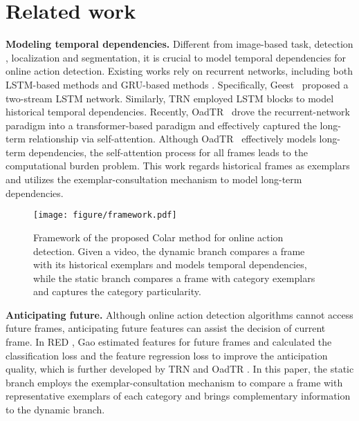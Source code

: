 \documentclass[10pt,twocolumn,letterpaper]{article}
\begin{document}
\section{Related work}

\noindent
\textbf{Modeling temporal dependencies.} Different from image-based task, \eg detection \cite{feng2020progressive, feng2020tcanet, yao2020automatic, feng2021saenet}, localization\cite{zhu2021few, guo2021strengthen, zhang2021weakly} and segmentation\cite{zhangD2021weakly}, it is crucial to model temporal dependencies for online action detection. Existing works rely on recurrent networks, including both LSTM-based methods \cite{de2018modeling, yuan2017temporal, xu2019temporal} and GRU-based methods \cite{eun2020learning}. Specifically, Geest~\etal \cite{de2018modeling} proposed a two-stream LSTM \cite{hochreiter1997long} network. Similarly, TRN \cite{xu2019temporal} employed LSTM blocks to model historical temporal dependencies. Recently, OadTR~\cite{wang2021oadtr} drove the recurrent-network paradigm into a transformer-based paradigm and effectively captured the long-term relationship via self-attention. Although OadTR~\cite{wang2021oadtr} effectively models long-term dependencies, the self-attention process for all frames leads to the computational burden problem. This work regards historical frames as exemplars and utilizes the exemplar-consultation mechanism to model long-term dependencies.

\begin{figure*}[thbp]
\centering
\texttt{[image: figure/framework.pdf]}
\caption{Framework of the proposed Colar method for online action detection. Given a video, the dynamic branch compares a frame with its historical exemplars and models temporal dependencies, while the static branch compares a frame with category exemplars and captures the category particularity.}
\label{figFramework}
\end{figure*}

\noindent
\textbf{Anticipating future.} Although online action detection algorithms cannot access future frames, anticipating future features can assist the decision of current frame. In RED \cite{gao2017red}, Gao \etal estimated features for future frames and calculated the classification loss and the feature regression loss to improve the anticipation quality, which is further developed by TRN \cite{xu2019temporal} and OadTR \cite{wang2021oadtr}. In this paper, the static branch employs the exemplar-consultation mechanism to compare a frame with representative exemplars of each category and brings complementary information to the dynamic branch.
\end{document}
